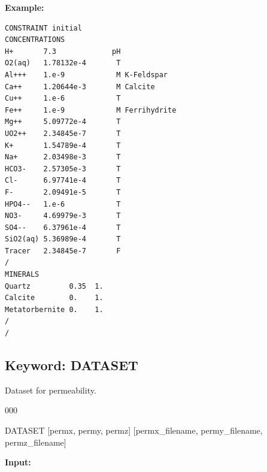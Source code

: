 \documentclass[12pt]{article}
\begin{document}

\noindent
{\bf Example:}
\begin{verbatim}
CONSTRAINT initial
CONCENTRATIONS
H+       7.3             pH
O2(aq)   1.78132e-4       T
Al+++    1.e-9            M K-Feldspar
Ca++     1.20644e-3       M Calcite
Cu++     1.e-6            T
Fe++     1.e-9            M Ferrihydrite
Mg++     5.09772e-4       T
UO2++    2.34845e-7       T
K+       1.54789e-4       T
Na+      2.03498e-3       T
HCO3-    2.57305e-3       T
Cl-      6.97741e-4       T
F-       2.09491e-5       T
HPO4--   1.e-6            T
NO3-     4.69979e-3       T
SO4--    6.37961e-4       T
SiO2(aq) 5.36989e-4       T
Tracer   2.34845e-7       F
/
MINERALS
Quartz         0.35  1.
Calcite        0.    1.
Metatorbernite 0.    1.
/
/
\end{verbatim}


\newpage
\protect\hypertarget{target_datset}{}

\subsection{Keyword: DATASET}


 Dataset for permeability.

\begin{deflist}{000}
\item[DATASET] [permx, permy, permz] [permx\_filename, permy\_filename, permz\_filename]
\end{deflist}


\newpage
\protect\hypertarget{target_dbg}{}

{\noindent\bf Input:}
\end{document}
